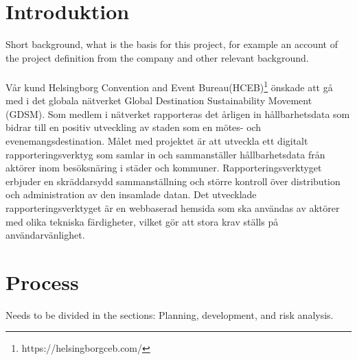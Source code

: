 \documentclass[12pt]{article}
\begin{document}
\section{Introduktion}
Short background, what is the basis for this project, for example an account of the project definition from the company and other relevant background.\\\\
Vår kund Helsingborg Convention and Event Bureau(HCEB)\footnote{https://helsingborgceb.com/} önskade att gå med i det globala nätverket Global Destination Sustainability Movement (GDSM). Som medlem i nätverket rapporteras det årligen in hållbarhetsdata som bidrar till en positiv utveckling av staden som en mötes- och evenemangsdestination. Målet med projektet är att utveckla ett digitalt rapporteringsverktyg som samlar in och sammanställer hållbarhetsdata från aktörer inom besöksnäring i städer och kommuner. Rapporteringsverktyget erbjuder en skräddarsydd sammanställning och större kontroll över distribution och administration av den insamlade datan. Det utvecklade rapporteringsverktyget är en webbaserad hemsida som ska användas av aktörer med olika tekniska färdigheter, vilket gör att stora krav ställs på användarvänlighet.







\section{Process}
Needs to be divided in the sections: Planning, development, and risk analysis.
\end{document}
